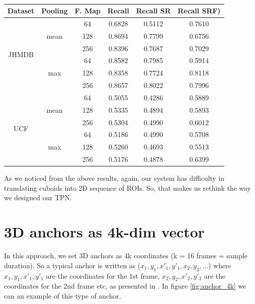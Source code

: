 \begin{table}[h]
  \centering
  \begin{tabular}{||c | c | c || c  c  c ||}
    \hline
    \textbf{Dataset} & \textbf{Pooling} & \textbf{F. Map} & \textbf{Recall} &  \textbf{ Recall SR}  &  \textbf{Recall SRF)} \\
    \hline
    \multirow{6}{*}{JHMDB} & \multirow{3}{*}{mean} & 64 &  0.6828  & 0.5112  & 0.7610 \\
    \cline{3-6}
    {} & {} & 128 & 0.8694 & 0.7799 & 0.6756 \\
    \cline{3-6}
    {} & {} & 256 & 0.8396 & 0.7687 & 0.7029 \\
    \cline{2-6}
    {} & \multirow{3}{*}{max} & 64 &  0.8582 & 0.7985 & 0.5914\\
    \cline{3-6}
    {} & {} & 128 & 0.8358 & 0.7724 & 0.8118 \\
    \cline{3-6}
    {} & {} & 256 & 0.8657 & 0.8022 & 0.7996 \\
    \hline
    \multirow{6}{*}{UCF} & \multirow{3}{*}{mean} & 64 & 0.5055 & 0.4286 & 0.5889 \\
    \cline{3-6}
    {} & {} & 128 & 0.5335 & 0.4894 & 0.5893 \\
    \cline{3-6}
    {} & {} & 256 & 0.5304 & 0.4990 & 0.6012 \\
    \cline{2-6}
    {} & \multirow{3}{*}{max} & 64 & 0.5186 & 0.4990 & 0.5708 \\
    \cline{3-6}
    {} & {} & 128 & 0.5260 & 0.4693 & 0.5513 \\
    \cline{3-6}
    {} & {} & 256 & 0.5176 & 0.4878 & 0.6399 \\
    \hline

  \end{tabular}
  \caption{}
  \label{table:reg_1_2}
\end{table}

As we noticed from the above results, again, our system has difficulty in translating cuboids into 2D sequence of ROIs.
So, that makes us rethink the way we designed our TPN.


\section{ 3D anchors as 4k-dim vector}
In this approach, we set 3D anchors as 4k coordinates (k = 16 frames = sample duration). So a typical anchor is written as ($x_1, y_1, x'_1, y'_1, x_2, y_2, ...$)
where $x_1, y_1, x'_1, y'_1 $ are the coordinates for the 1st frame, $x_2, y_2, x'_2, y'_2$ are the coordinates for the 2nd frame etc, as presented in \cite{DBLP:journals/corr/abs-1712-09184}.
In figure \ref{fig:anchor_4k} we can an example of this type of anchor.

